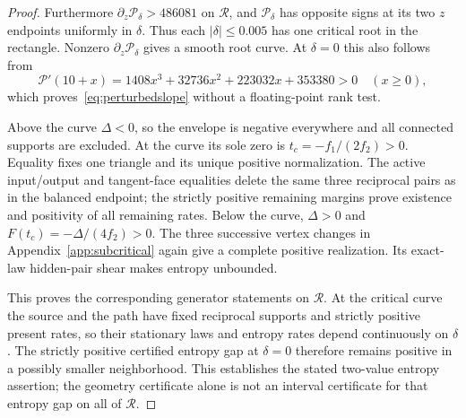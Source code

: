 \begin{proof}
Furthermore $\partial_z\mathcal P_\delta>486081$ on $\mathcal R$, and
$\mathcal P_\delta$ has opposite signs at its two $z$ endpoints uniformly
in $\delta$.  Thus each $|\delta|\le0.005$ has one critical root in the
rectangle.  Nonzero $\partial_z\mathcal P_\delta$ gives a smooth root
curve.  At $\delta=0$ this also follows from
\begin{equation}
 \mathcal P'(10+x)=1408x^3+32736x^2+223032x+353380>0
 \quad(x\ge0),
\end{equation}
which proves~\eqref{eq:perturbedslope} without a floating-point rank test.

Above the curve $\Delta<0$, so the envelope is negative everywhere and
all connected supports are excluded.  At the curve its sole zero is
$t_c=-f_1/(2f_2)>0$.  Equality fixes one triangle and its unique positive
normalization.  The active input/output and tangent-face equalities
delete the same three reciprocal pairs as in the balanced endpoint;
the strictly positive remaining margins prove existence and positivity
of all remaining rates.  Below the curve, $\Delta>0$ and
$F(t_c)=-\Delta/(4f_2)>0$.  The three successive vertex changes in
Appendix~\ref{app:subcritical} again give a complete positive realization.
Its exact-law hidden-pair shear makes entropy unbounded.

This proves the corresponding generator statements on $\mathcal R$.
At the critical curve the source and the path have fixed reciprocal
supports and strictly positive present rates, so their stationary laws
and entropy rates depend continuously on $\delta$.  The strictly positive
certified entropy gap at $\delta=0$ therefore remains positive in a
possibly smaller neighborhood.  This establishes the stated two-value
entropy assertion; the geometry certificate alone is not an interval
certificate for that entropy gap on all of $\mathcal R$.
\end{proof}
